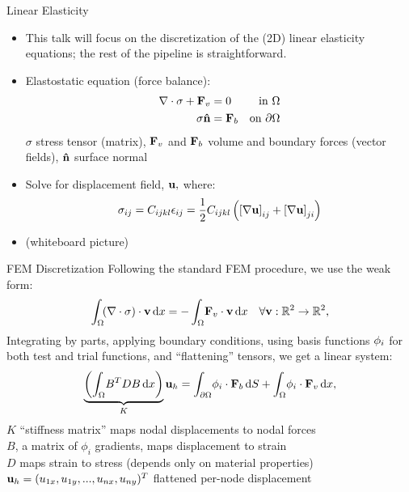 \begin{frame}{Linear Elasticity}
    \begin{itemize}
        \item This talk will focus on the discretization of the (2D) linear
              elasticity equations; the rest of the pipeline is straightforward.
 \pause \item Elastostatic equation (force balance):
     \begin{align*}
         \nabla \cdot \sigma + {\bf F}_v &= 0 &\text{in }\Omega \\
         \sigma {\bf \hat{n}} &= {\bf F}_b &\text{on }\partial \Omega
    \end{align*}
    $\sigma$ stress tensor (matrix), ${\bf F}_v$ and ${\bf F}_b$ volume
    and boundary forces (vector fields), ${\bf \hat{n}}$ surface normal
        \pause \item Solve for displacement field, ${\bf u},$ where:
        \begin{align*}
            \sigma_{ij} = C_{ijkl} \epsilon_{ij} = \frac{1}{2} C_{ijkl}
            \left(\left[\nabla {\bf u}\right]_{ij} + \left[\nabla {\bf u}\right]_{ji}\right)
        \end{align*}
    \pause \item (whiteboard picture)
    \end{itemize}
\end{frame}

\begin{frame}{FEM Discretization}
        Following the standard FEM procedure, we use the weak form:
            \begin{align*}
                \int_\Omega \! (\nabla \cdot \sigma) \cdot {\bf v}\, \mathrm{d}x
                = -\int_{\Omega} \! {\bf F}_v \cdot {\bf v}\, \mathrm{d}x \quad
                \forall {\bf v}: \mathbb{R}^2 \to \mathbb{R}^2,
            \end{align*}
            Integrating by parts, applying boundary conditions, using basis
            functions ${\bf \phi}_i$ for both test and trial functions, and
            ``flattening'' tensors, we get a linear system:
     \pause \begin{align*}
                \underbrace{\left( \int_{\Omega} \! B^T D B \, \mathrm{d}x \right)}_{K} {\bf u}_h = 
                \int_{\partial \Omega} \! {\bf \phi}_i \cdot {\bf F}_b\, \mathrm{d}S + 
                \int_{\Omega} \! {\bf \phi}_i \cdot {\bf F}_v\, \mathrm{d}x,
            \end{align*}
            $K$ ``stiffness matrix'' maps nodal displacements to nodal forces \\
            $B$, a matrix of $\phi_i$ gradients, maps displacement to strain \\
            $D$ maps strain to stress (depends only on material properties)
            ${\bf u}_h = (u_{1x}, u_{1y}, ..., u_{nx}, u_{ny})^T$ flattened per-node displacement
\end{frame}

